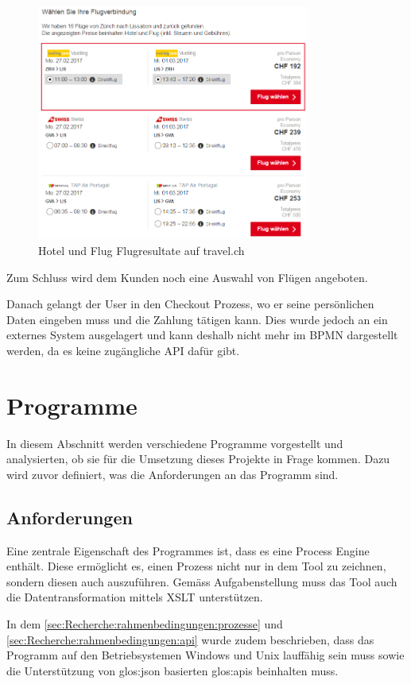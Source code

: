 \begin{figure}[H]
	\centering
	\includegraphics[width=0.8\textwidth]{images/travel-flights.png}
	\caption{Hotel und Flug Flugresultate auf travel.ch}
	\label{fig:recherche:travelch:flights}
\end{figure}
Zum Schluss wird dem Kunden noch eine Auswahl von Flügen angeboten.

Danach gelangt der User in den Checkout Prozess, wo er seine persönlichen Daten eingeben muss und die Zahlung tätigen kann. Dies wurde jedoch an ein externes System ausgelagert und kann deshalb nicht mehr im BPMN dargestellt werden, da es keine zugängliche API dafür gibt. 

\section{Programme}
In diesem Abschnitt werden verschiedene Programme vorgestellt und analysierten, ob sie für die Umsetzung dieses Projekte in Frage kommen. Dazu wird zuvor definiert, was die Anforderungen an das Programm sind.

\subsection{Anforderungen}
\label{sec:Recherche:programme:anforderungen}
Eine zentrale Eigenschaft des Programmes ist, dass es eine Process Engine enthält. Diese ermöglicht es, einen Prozess nicht nur in dem Tool zu zeichnen, sondern diesen auch auszuführen. Gemäss Aufgabenstellung muss das Tool auch die Datentransformation mittels XSLT unterstützen.

In dem \cref{sec:Recherche:rahmenbedingungen:prozesse}  und \cref{sec:Recherche:rahmenbedingungen:api}  wurde zudem beschrieben, dass das Programm auf den Betriebsystemen Windows und Unix lauffähig sein muss sowie die Unterstützung von \Gls{glos:json} basierten \Glspl{glos:api} beinhalten muss.

